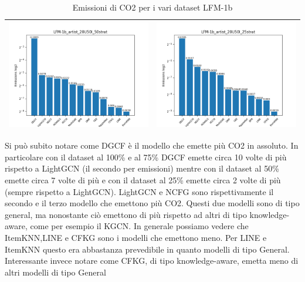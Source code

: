 \begin{table}[H]
\begin{tabularx}{\textwidth}{|X|X|}
        \hline
        \includegraphics[width=\linewidth, trim=0 0 0 0]{images/emissions_LFM-1b_artist_20U50I_50strat.png} &
        \includegraphics[width=\linewidth, trim=0 0 0 0]{images/emissions_LFM-1b_artist_20U50I_25strat.png} \\
        \hline
    \end{tabularx}
    \caption{Emissioni di CO2 per i vari dataset LFM-1b}
    \label{tab:emissions_info}
\end{table}

\noindent Si può subito notare come DGCF è il modello che emette più CO2 in assoluto.
In particolare con il dataset al 100\% e al 75\% DGCF emette circa 10 volte di più rispetto a LightGCN (il secondo per emissioni)
mentre con il dataset al 50\% emette circa 7 volte di più e con il dataset al 25\% emette circa 2 volte di più (sempre rispetto a LightGCN).
LightGCN e NCFG sono rispettivamente il secondo e il terzo modello che emettono più CO2.
Questi due modelli sono di tipo general, ma nonostante ciò emettono di più rispetto ad altri di tipo knowledge-aware, come per esempio il KGCN.
In generale possiamo vedere che ItemKNN,LINE e CFKG sono i modelli che emettono meno.
Per LINE e ItemKNN questo era abbastanza prevedibile in quanto modelli di tipo General. Interessante invece notare come CFKG, di tipo knowledge-aware, emetta meno di altri modelli di tipo General


